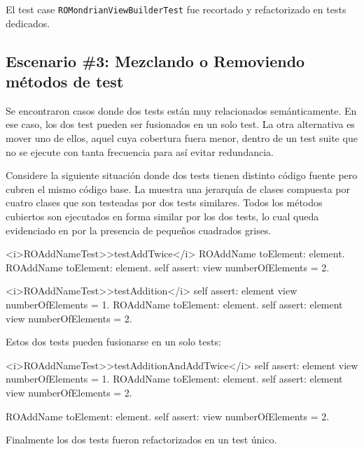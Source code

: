 \par El test case {\tt ROMondrianViewBuilderTest} fue recortado y refactorizado en tests dedicados.


\subsection{Escenario \#3: Mezclando o Removiendo métodos de test}

\par Se encontraron casos donde dos tests están muy relacionados semánticamente. En ese caso, los dos test pueden ser fusionados en un solo test. La otra alternativa es mover uno de ellos, aquel cuya cobertura fuera menor, dentro de un test suite que no se ejecute con tanta frecuencia para así evitar redundancia.


\par Considere la siguiente situación donde dos tests tienen distinto código fuente pero cubren el mismo código base. La  muestra una jerarquía de clases compuesta por cuatro clases que son testeadas por dos tests similares. Todos los métodos cubiertos son ejecutados en forma similar por los dos tests, lo cual queda evidenciado en por la presencia de pequeños cuadrados grises. %


\begin{codeWithLineNumbers}
<i>ROAddNameTest>>testAddTwice</i>
	ROAddName toElement: element.
	ROAddName toElement: element.
	self assert: view numberOfElements = 2.
		
<i>ROAddNameTest>>testAddition</i>
	self assert: element view numberOfElements = 1.
	ROAddName toElement: element.
	self assert: element view numberOfElements = 2.	 
\end{codeWithLineNumbers}

\par Estos dos tests pueden fusionarse en un solo tests: 

\begin{codeWithLineNumbers}
<i>ROAddNameTest>>testAdditionAndAddTwice</i>
	self assert: element view numberOfElements = 1.
	ROAddName toElement: element.
	self assert: element view numberOfElements = 2.

	ROAddName toElement: element.	
	self assert: view numberOfElements = 2.

\end{codeWithLineNumbers}

\par Finalmente los dos tests fueron refactorizados en un test único.

